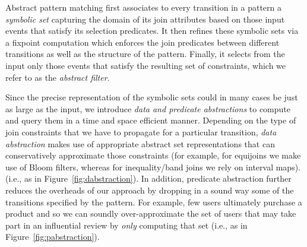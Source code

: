 Abstract pattern matching first associates to every transition in a pattern a
{\em symbolic set} capturing the domain of its join attributes based on those
input events that satisfy its selection predicates.  It then refines these
symbolic sets via a fixpoint computation which enforces the join predicates
between different transitions as well as the structure of the pattern.
Finally, it selects from the input only those events that satisfy the resulting
set of constraints, which we refer to as the {\em abstract filter}.

Since the precise representation of the symbolic sets could in many cases be
just as large as the input, we introduce {\em data and predicate abstractions}
to compute and query them in a time and space efficient manner.  Depending on
the type of join constraints that we have to propagate for a particular
transition, {\em data abstraction} makes use of appropriate abstract set
representations that can conservatively approximate those constraints (for
example, for equijoins we make use of Bloom filters\cite{Bloom:1970}, whereas
for inequality/band joins we rely on interval maps).  (i.e., as in
Figure~\ref{fig:dabstraction}).  In addition, predicate abstraction further
reduces the overheads of our approach by dropping in a sound way some of the
transitions specified by the pattern.  For example, few users ultimately purchase
a product and so we can soundly over-approximate the set of users that may take
part in an influential review by \emph{only} computing that set (i.e., as in
Figure~\ref{fig:pabstraction}).


